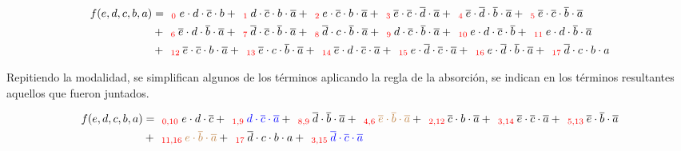 \begin{equation*}
\begin{align*}
f(e,d,c,b,a) & = _{\ \ \color{red} 0} {e \cdot d \cdot \overline{c} \cdot b} 
+ _{\ \ \color{red} 1}  {d \cdot \overline{c} \cdot b \cdot \overline{a}}
+ _{\ \ \color{red} 2}  {e \cdot \overline{c} \cdot b \cdot \overline{a}}
+ _{\ \ \color{red} 3}  {\overline{e} \cdot \overline{c} \cdot \overline{d} \cdot \overline{a}}
+ _{\ \ \color{red} 4}  {\overline{e} \cdot \overline{d} \cdot \overline{b} \cdot \overline{a}}
+ _{\ \ \color{red} 5}  {\overline{e} \cdot \overline{c} \cdot \overline{b} \cdot \overline{a}} \\
& + _{\ \ \color{red} 6}  {\overline{e} \cdot d \cdot \overline{b} \cdot \overline{a}} 
+ _{\ \ \color{red} 7}  {\overline{d} \cdot \overline{c} \cdot \overline{b} \cdot \overline{a}}
+ _{\ \ \color{red} 8}  {\overline{d} \cdot c \cdot \overline{b} \cdot \overline{a}}
+ _{\ \ \color{red} 9}  {d \cdot \overline{c} \cdot \overline{b} \cdot \overline{a}} 
+ _{\ \ \color{red} 10}  {e \cdot d \cdot \overline{c} \cdot \overline{b}}
+ _{\ \ \color{red} 11}  {e \cdot d \cdot \overline{b} \cdot \overline{a}} \\
& + _{\ \ \color{red} 12}  {\overline{e} \cdot \overline{c} \cdot b \cdot \overline{a}}
+ _{\ \ \color{red} 13}  {\overline{e} \cdot c \cdot \overline{b} \cdot \overline{a}} 
+ _{\ \ \color{red} 14}  {\overline{e} \cdot d \cdot \overline{c} \cdot \overline{a}}
+ _{\ \ \color{red} 15}  {e \cdot \overline{d} \cdot \overline{c} \cdot \overline{a}} 
+ _{\ \ \color{red} 16}  {e \cdot \overline{d} \cdot \overline{b} \cdot \overline{a}}
+ _{\ \ \color{red} 17}  {\overline{d} \cdot c \cdot b \cdot a}
\end{align*}
\end{equation*}

Repitiendo la modalidad, se simplifican algunos de los t\'erminos aplicando la regla de la absorci\'on,
se indican en los t\'erminos resultantes aquellos que fueron juntados.

\begin{equation*}
\begin{align*}
f(e,d,c,b,a) & = _{\ \ \color{red} 0,10} {e \cdot d \cdot \overline{c}}
+ _{\ \ \color{red} 1,9} {\color{blue} d \cdot \overline{c} \cdot \overline{a}}
+ _{\ \ \color{red} 8,9} {\overline{d} \cdot \overline{b} \cdot \overline{a}}
+ _{\ \ \color{red} 4,6} {\color{brown} \overline{e} \cdot \overline{b} \cdot \overline{a}}
+ _{\ \ \color{red} 2,12} {\overline{c} \cdot b \cdot \overline{a}}
+ _{\ \ \color{red} 3,14} {\overline{e} \cdot \overline{c} \cdot \overline{a}}
+ _{\ \ \color{red} 5,13} {\overline{e} \cdot \overline{b} \cdot \overline{a}} \\
& + _{\ \ \color{red} 11,16} {\color{brown} e \cdot \overline{b} \cdot \overline{a}}
+ _{\ \ \color{red} 17} {\overline{d} \cdot c \cdot b \cdot a}
+ _{\ \ \color{red} 3,15} {\color{blue} \overline{d} \cdot \overline{c} \cdot \overline{a}}
\end{align*}
\end{equation*}


